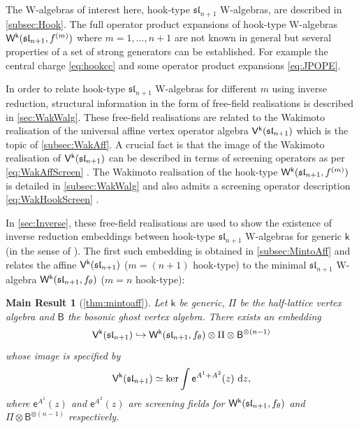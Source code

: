 \documentclass[10pt,a4paper]{amsart}
\numberwithin{equation}{section}
\renewcommand{\cong}{\simeq} %
\newcommand{\dd}{\mathrm{d}}   %
\newcommand{\ee}{\mathsf{e}}   %
\newcommand{\kk}{\mathsf{k}}   %
\DeclarePairedDelimiter{\brac}{\lparen}{\rparen}   %
\newcommand{\alg}[1]{\mathfrak{#1}}  %
\newcommand{\VOA}[1]{\mathsf{#1}}    %
\newcommand{\SLA}[2]{\alg{#1}_{#2}}                      %
\newcommand{\slnpone}{\SLA{sl}{n+1}}
\newcommand{\fmin}{f_\theta}                                        %
\newcommand{\fhook}[1]{f^{(#1)}}                                  %
\newcommand{\Wsymb}{\VOA{W}}
\newcommand{\uaffvoa}[2]{\VOA{V}^{#1}\brac{#2}}                   %
\newcommand{\bgvoa}{\VOA{B}}                                      %
\newcommand{\uQHR}[3]{\Wsymb^{#1}\brac{#2,#3}}                    %
\theoremstyle{plain}
\newtheorem{mthm}{Main Result}
\begin{document}
The W-algebras of interest here, hook-type $\slnpone$ W-algebras, are described in \cref{subsec:Hook}. The full operator product expansions of hook-type W-algebras $\uQHR{\kk}{\slnpone}{\fhook{m}}$ where $m=1, \dots, n+1$ are not known in general but several properties of a set of strong generators can be established. For example the central charge \eqref{eq:hookcc} and some operator product expansions \eqref{eq:JPOPE}.

In order to relate hook-type $\slnpone$ W-algebras for different $m$ using inverse reduction, structural information in the form of free-field realisations is described in \cref{sec:WakWalg}. These free-field realisations are related to the Wakimoto realisation of the universal affine vertex operator algebra $\uaffvoa{\kk}{\slnpone}$ which is the topic of \cref{subsec:WakAff}. A crucial fact is that the image of the Wakimoto realisation of $\uaffvoa{\kk}{\slnpone}$ can be described in terms of screening operators as per \eqref{eq:WakAffScreen} \cite{Fre05Opers}. The Wakimoto realisation of the hook-type $\uQHR{\kk}{\slnpone}{\fhook{m}}$ is detailed in \cref{subsec:WakWalg} and also admits a screening operator description \eqref{eq:WakHookScreen} \cite{GenScreen20}.

In \cref{sec:Inverse}, these free-field realisations are used to show the existence of inverse reduction embeddings between hook-type $\slnpone$ W-algebras for generic $\kk$ (in the sense of \cite[Def.~4.5]{Gen17}). The first such embedding is obtained in \cref{subsec:MintoAff} and relates the affine $\uaffvoa{\kk}{\slnpone}$ ($m=(n+1)$ hook-type) to the minimal $\slnpone$ W-algebra $\uQHR{\kk}{\slnpone}{\fmin}$ ($m=n$ hook-type):

\begin{mthm}[\cref{thm:mintoaff}]
Let $\kk$ be generic, $\Pi$ be the half-lattice vertex algebra and $\bgvoa$ the bosonic ghost vertex algebra. There exists an embedding 
%
\begin{equation}
    \uaffvoa{\kk}{\slnpone} \hookrightarrow \uQHR{\kk}{\slnpone}{\fmin} \otimes \Pi \otimes \bgvoa^{\otimes(n-1)}
\end{equation}
%
whose image is specified by
%
\begin{equation}
    \uaffvoa{\kk}{\slnpone} \cong \textup{\normalfont ker} \int  \ee^{A^1+A^2}(z) \ \dd z,
\end{equation}
%
where $\ee^{A^1}(z)$ and $\ee^{A^2}(z)$ are screening fields for $\uQHR{\kk}{\slnpone}{\fmin}$ and $\Pi \otimes \bgvoa^{\otimes(n-1)}$ respectively.
\end{mthm}
\end{document}
